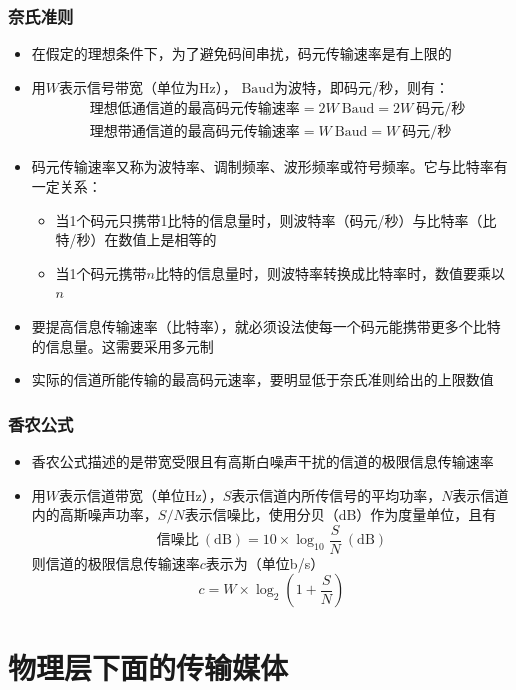 \documentclass[cs4size,a4paper,10pt]{ctexart}
\begin{document}
	\subsubsection{奈氏准则}
	\begin{itemize}
		\item 在假定的理想条件下，为了避免码间串扰，码元传输速率是有上限的
		\item 用$W$表示信号带宽（单位为Hz）， $\mathrm{Baud}$为波特，即码元/秒，则有：
		$$
		\begin{aligned}
		& \mbox{理想低通信道的最高码元传输速率}=2W\ \mathrm{Baud}=2W\ \mbox{码元/秒} \\
		& \mbox{理想带通信道的最高码元传输速率}=W\ \mathrm{Baud}=W\ \mbox{码元/秒}
		\end{aligned}
		$$
		\item 码元传输速率又称为波特率、调制频率、波形频率或符号频率。它与比特率有一定关系：
		\begin{itemize}
			\item 当1个码元只携带1比特的信息量时，则波特率（码元/秒）与比特率（比特/秒）在数值上是相等的
			\item 当1个码元携带$n$比特的信息量时，则波特率转换成比特率时，数值要乘以$n$
		\end{itemize}
		\item 要提高信息传输速率（比特率），就必须设法使每一个码元能携带更多个比特的信息量。这需要采用多元制
		\item 实际的信道所能传输的最高码元速率，要明显低于奈氏准则给出的上限数值
	\end{itemize}

	\subsubsection{香农公式}

	\begin{itemize}
		\item 香农公式描述的是带宽受限且有高斯白噪声干扰的信道的极限信息传输速率
		\item 用$W$​表示信道带宽（单位Hz），$S$​表示信道内所传信号的平均功率，$N$​表示信道内的高斯噪声功率，$S/N$​​表示信噪比，使用分贝（dB）作为度量单位，且有
		$$
		\mbox{信噪比}\ \mathrm{(dB)}=10\times \log_{10} \frac{S}{N}\ \mathrm{(dB)}
		$$
		则信道的极限信息传输速率$c$​表示为（单位b/s）
		$$c=W\times \log_2\left(1+\frac{S}{N}\right)$$
	\end{itemize}


	\section{物理层下面的传输媒体}
\end{document}
